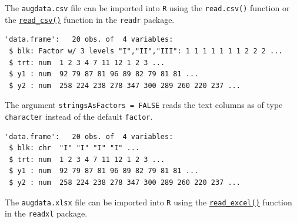 The \texttt{augdata.csv} file can be imported into \texttt{R} using the
\texttt{read.csv()} function or the
\href{https://readr.tidyverse.org/reference/read_delim.html}{\texttt{read\_csv()}}
function in the \texttt{readr} package.

\begin{Shaded}
\begin{Highlighting}[]
\StringTok{ }\NormalTok{(} \NormalTok{)}
\end{Highlighting}
\end{Shaded}

\begin{verbatim}
'data.frame':   20 obs. of  4 variables:
 $ blk: Factor w/ 3 levels "I","II","III": 1 1 1 1 1 1 1 2 2 2 ...
 $ trt: num  1 2 3 4 7 11 12 1 2 3 ...
 $ y1 : num  92 79 87 81 96 89 82 79 81 81 ...
 $ y2 : num  258 224 238 278 347 300 289 260 220 237 ...
\end{verbatim}

The argument \texttt{stringsAsFactors\ =\ FALSE} reads the text columns
as of type \texttt{character} instead of the default \texttt{factor}.

\begin{Shaded}
\begin{Highlighting}[]
\StringTok{ }\NormalTok{(} \NormalTok{, } \NormalTok{)}
\end{Highlighting}
\end{Shaded}

\begin{verbatim}
'data.frame':   20 obs. of  4 variables:
 $ blk: chr  "I" "I" "I" "I" ...
 $ trt: num  1 2 3 4 7 11 12 1 2 3 ...
 $ y1 : num  92 79 87 81 96 89 82 79 81 81 ...
 $ y2 : num  258 224 238 278 347 300 289 260 220 237 ...
\end{verbatim}

The \texttt{augdata.xlsx} file can be imported into \texttt{R} using the
\href{https://readxl.tidyverse.org/reference/read_excel.html}{\texttt{read\_excel()}}
function in the \texttt{readxl} package.

\begin{Shaded}
\begin{Highlighting}[]
\StringTok{ }\NormalTok{(} \NormalTok{)}
\end{Highlighting}
\end{Shaded}

